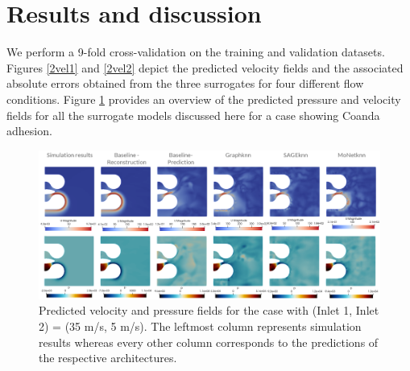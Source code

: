 \section{Results and discussion}
We perform a 9-fold cross-validation on the training and validation datasets. Figures \ref{2vel1} and \ref{2vel2} depict the predicted velocity fields and the associated absolute errors obtained from the three surrogates for four different flow conditions. Figure \ref{aloop} provides an overview of the predicted pressure and velocity fields for all the surrogate models discussed here for a case showing Coanda adhesion. \\
\begin{figure}[ht]
    \centering
    \includegraphics[width=15cm]{images/Methodology/presvelcomp.png}
    \caption{Predicted velocity and pressure fields for the case with (Inlet 1, Inlet 2) = (35 m/s, 5 m/s). The leftmost column represents simulation results whereas every other column corresponds to the predictions of the respective architectures.} 
    \label{aloop}
\end{figure}
